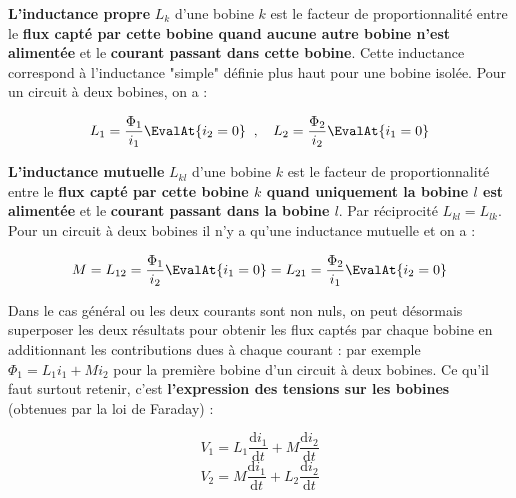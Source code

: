 \textbf{L'inductance propre} $L_k$ d'une bobine $k$ est le facteur de proportionnalité entre le \textbf{flux capté par cette bobine quand aucune autre bobine n'est alimentée} et le \textbf{courant passant dans cette bobine}. Cette inductance correspond à l'inductance "simple" définie plus haut pour une bobine isolée. Pour un circuit à deux bobines, on a :

\begin{equation}
L_1 = \frac{\Phi_1}{i_1}\EvalAt{i_2 = 0} \; \; \mathrm{,} \; \; \; \; L_2 = \frac{\Phi_2}{i_2}\EvalAt{i_1 = 0}
\end{equation}

\textbf{L'inductance mutuelle} $L_{kl}$ d'une bobine $k$ est le facteur de proportionnalité entre le \textbf{flux capté par cette bobine $k$ quand uniquement la bobine $l$ est alimentée} et le \textbf{courant passant dans la bobine $l$}. Par réciprocité $L_{kl} = L_{lk}$. Pour un circuit à deux bobines il n'y a qu'une inductance mutuelle et on a :

\begin{equation}
M = L_{12} = \frac{\Phi_1}{i_2}\EvalAt{i_1 = 0} = L_{21} = \frac{\Phi_2}{i_1} \EvalAt{i_2 = 0}
\end{equation}


Dans le cas général ou les deux courants sont non nuls, on peut désormais superposer les deux résultats pour obtenir les flux captés par chaque bobine en additionnant les contributions dues à chaque courant : par exemple $\Phi_1 = L_1 i_1 + M i_2$ pour la première bobine d'un circuit à deux bobines. Ce qu'il faut surtout retenir, c'est \textbf{l'expression des tensions sur les bobines} (obtenues par la loi de Faraday) :

\begin{equation}
V_1 = L_1 \frac{\mathrm{d} i_1}{\mathrm{d}t} + M \frac{\mathrm{d} i_2}{\mathrm{d}t}
\end{equation}
\begin{equation}
V_2 = M \frac{\mathrm{d} i_1}{\mathrm{d}t} + L_2 \frac{\mathrm{d} i_2}{\mathrm{d}t}
\end{equation}

